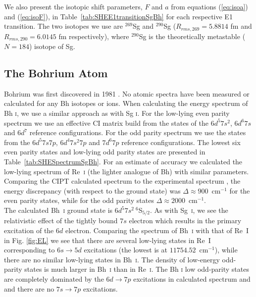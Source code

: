 \documentclass[8pt,a4paper, twoside]{report}
\begin{document}
We also present the isotopic shift parameters, $F$ and $a$ from equations (\ref{eq:isoa}) and (\ref{eq:isoF}), in Table~\ref{tab:SHEE1transitionSgBh} for each respective E1 transition. The two isotopes we use are $^{269}$Sg  and $^{290}$Sg ($R_{rms,\text{269}} = 5.8814$ fm and $R_{rms,\text{290}}  = 6.0145$ fm respectively),  where $^{290}$Sg is the theoretically  metastable ($N=184$) isotope of Sg. 

\subsection{The Bohrium Atom}  \label{sec:Bh}

 Bohrium was first discovered in 1981 \cite{Munzenberg1981}. No atomic spectra have been measured or calculated for any Bh isotopes or ions. When calculating the energy spectrum of Bh \textsc{i}, we use a similar approach as with Sg \textsc{i}.  For the low-lying even parity spectrum we use an effective CI matrix build from the states of the $6d^5 7s^2$, $6d^6 7s$ and $6d^7$ reference configurations. For the odd parity spectrum we use the states from the $6d^5 7s 7p$, $6d^4 7s^2 7p$ and $7d^6 7p$ reference configurations. The lowest six even parity states and low-lying odd parity states are presented in Table~\ref{tab:SHESpectrumSgBh}. For an estimate of accuracy we calculated the low-lying spectrum of Re~\textsc{i} (the lighter analogue of Bh) with similar parameters. Comparing the CIPT calculated spectrum to the experimental spectrum \cite{NIST_ASD}, the energy discrepancy (with respect to the ground state) was $\Delta \approx 900$~cm$^{-1}$ for the even parity states, while for the odd parity states $\Delta \approx 2000$~cm$^{-1}$.\\
\linebreak
 The calculated Bh~\textsc{i} ground state is $6d^5 7s^2 \ ^6$S$_{5/2}$.  As with Sg~\textsc{i},  we see the relativistic effect of the tightly bound $7s$ electron which results in the primary excitation of the $6d$ electron. Comparing the spectrum of Bh~\textsc{i} with that of Re~\textsc{I} in Fig. \ref{fig:EL} we see that there are several low-lying states in Re~\textsc{I} corresponding to $6s \rightarrow 5d$ excitations (the lowest is at $11 754.52$~cm$^{-1}$), while there are no similar low-lying states in Bh~\textsc{i}.  The density of low-energy odd-parity states is much larger in Bh~\textsc{i} than in Re~\textsc{i}. The Bh \textsc{i} low odd-parity states are completely dominated by the $6d \rightarrow 7p$ excitations in calculated spectrum and and there are no  $7s \rightarrow 7p$ excitations. 
\end{document}
